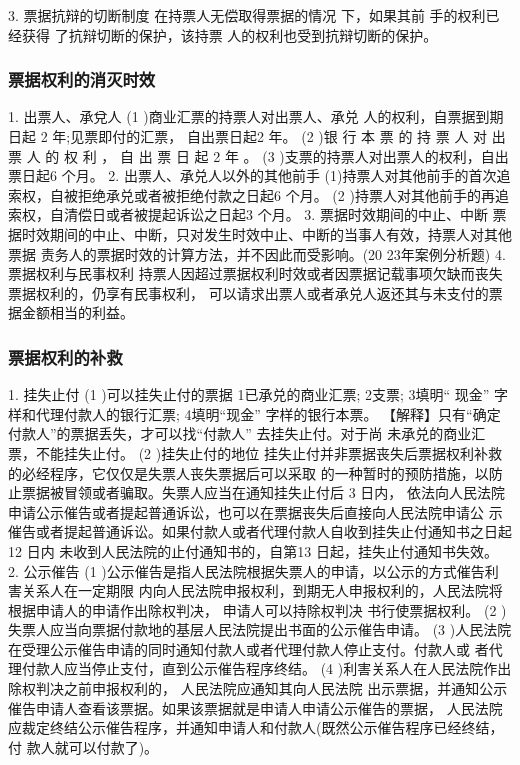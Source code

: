 \documentclass[UTF8,12pt]{ctexart}
\numberwithin{equation}{section} %
\numberwithin{figure}{section}
\numberwithin{table}{section}
\begin{document}
	3. 票据抗辩的切断制度
	在持票人无偿取得票据的情况 下，如果其前 手的权利已经获得 了抗辩切断的保护，该持票
	人的权利也受到抗辩切断的保护。
	
	\subsubsection{票据权利的消灭时效} 
	1. 出票人、承兌人
	(1 )商业汇票的持票人对出票人、承兑 人的权利，自票据到期日起 2 年;见票即付的汇票，
	自出票日起2 年。
	(2 )银 行 本 票 的 持 票 人 对 出 票 人 的 权 利 ， 自 出 票 日 起 2 年 。
	(3 )支票的持票人对出票人的权利，自出票日起6 个月。
	2. 出票人、承兑人以外的其他前手
	(1)持票人对其他前手的首次追索权，自被拒绝承兑或者被拒绝付款之日起6 个月。
	(2 )持票人对其他前手的再追索权，自清偿日或者被提起诉讼之日起3 个月。
	3. 票据时效期间的中止、中断
	票据时效期间的中止、中断，只对发生时效中止、中断的当事人有效，持票人对其他票据
	责务人的票据时效的计算方法，并不因此而受影响。(20 23年案例分析题)
	4. 票据权利与民事权利
	持票人因超过票据权利时效或者因票据记载事项欠缺而丧失票据权利的，仍享有民事权利，
	可以请求出票人或者承兑人返还其与未支付的票据金额相当的利益。
	
	
	\subsubsection{票据权利的补救}
	1. 挂失止付
	(1 )可以挂失止付的票据
	1已承兑的商业汇票;
	2支票;
	3填明“ 现金” 字样和代理付款人的银行汇票;
	4填明“现金” 字样的银行本票。
	【解释】只有“确定付款人”的票据丢失，才可以找“付款人” 去挂失止付。对于尚
	未承兑的商业汇票，不能挂失止付。
	(2 )挂失止付的地位
	挂失止付并非票据丧失后票据权利补救的必经程序，它仅仅是失票人丧失票据后可以采取
	的一种暂时的预防措施，以防止票据被冒领或者骗取。失票人应当在通知挂失止付后 3 日内，
	依法向人民法院申请公示催告或者提起普通诉讼，也可以在票据丧失后直接向人民法院申请公
	示催告或者提起普通诉讼。如果付款人或者代理付款人自收到挂失止付通知书之日起 12 日内
	未收到人民法院的止付通知书的，自第13 日起，挂失止付通知书失效。
	2. 公示催告
	(1 )公示催告是指人民法院根据失票人的申请，以公示的方式催告利害关系人在一定期限
	内向人民法院申报权利，到期无人申报权利的，人民法院将根据申请人的申请作出除权判决，
	申请人可以持除权判决 书行使票据权利。
	(2 )失票人应当向票据付款地的基层人民法院提出书面的公示催告申请。
	(3 )人民法院在受理公示催告申请的同时通知付款人或者代理付款人停止支付。付款人或
	者代理付款人应当停止支付，直到公示催告程序终结。
	(4 )利害关系人在人民法院作出除权判决之前申报权利的， 人民法院应通知其向人民法院
	出示票据，并通知公示催告申请人查看该票据。如果该票据就是申请人申请公示催告的票据，
	人民法院应裁定终结公示催告程序，并通知申请人和付款人(既然公示催告程序已经终结，付
	款人就可以付款了)。
	
\end{document}
